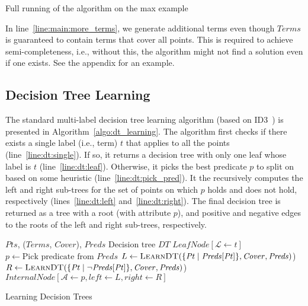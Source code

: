 \documentclass{llncs}
\newcommand\Points{\mathit{Pts}}
\newcommand\Point{\mathit{Pt}}
\newcommand\Predicates{\mathit{Preds}}
\newcommand\Pred{p}
\newcommand\Terms{\mathit{Terms}}
\newcommand\Term{t}
\newcommand\Cover{\mathit{Cover}}
\newcommand\DecisionTree{\mathit{DT}}
\newcommand\Attribute{\mathcal{A}}
\newcommand\Label{\mathcal{L}}
\begin{document}
\begin{example}
  Full running of the algorithm on the max example
\end{example}

\begin{remark}
  In line~\ref{line:main:more_terms}, we generate additional terms even
  though $\Terms$ is guaranteed to contain terms that cover all points.
  This is required to achieve semi-completeness, i.e., without this, the
  algorithm might not find a solution even if one exists.
  See the appendix for an example.
\end{remark}

\subsection{Decision Tree Learning}
\label{sec:decision_trees}

The standard multi-label decision tree learning algorithm (based on
ID3~\cite{quinlan-86}) is presented in Algorithm~\ref{algo:dt_learning}.
The algorithm first checks if there exists a single label (i.e., term)
$\Term$ that applies to all the points (line~\ref{line:dt:single}).
If so, it returns a decision tree with only one leaf whose label is
$\Term$ (line~\ref{line:dt:leaf}).
Otherwise, it picks the best predicate $\Pred$ to split on based on some
heuristic (line~\ref{line:dt:pick_pred}).
It the recursively computes the left and right sub-trees for the set of
points on which $\Pred$ holds and does not hold, respectively
(lines~\ref{line:dt:left} and~\ref{line:dt:right}).
The final decision tree is returned as a tree with a root (with
attribute $\Pred$), and positive and negative edges to the roots of the
left and right sub-trees, respectively.

\begin{algorithm}
  \begin{algorithmic}[1]
    \Require $\Points$, ($\Terms$, $\Cover$), $\Predicates$
    \Ensure Decision tree $\DecisionTree$
    \If { $\exists \Term : \Cover[\Terms] \supseteq \Points$ }\label{line:dt:single}
    \Return $\mathit{LeafNode}[\Label \gets \Term]$ \label{line:dt:leaf}
    \EndIf
    \State $\Pred \gets \mbox{Pick predicate from $\Predicates$}$\label{line:dt:pick_pred}
    \State $L \gets \Call{LearnDT}{\{ \Point \mid \Predicates[\Point] \}, \Cover, \Predicates }$\label{line:dt:left})
    \State $R \gets \Call{LearnDT}{\{ \Point \mid \neg \Predicates[\Point] \}, \Cover, \Predicates }$\label{line:dt:right})
    \State \Return $\mathit{InternalNode}[\Attribute \gets \Pred,  left \gets L , right \gets R ]$
  \end{algorithmic}
  \caption{Learning Decision Trees}
  \label{algo:dt_learning}
\end{algorithm}
\end{document}
